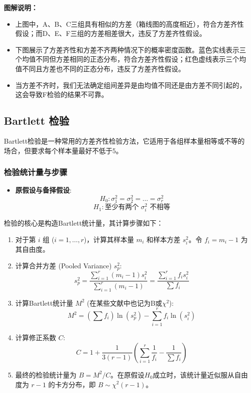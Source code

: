\documentclass[12pt, a4paper]{amsart}
\begin{document}
\textbf{图解说明：}
\begin{itemize}
    \item 上图中，A、B、C三组具有相似的方差（箱线图的高度相近），符合方差齐性假设；而D、E、F三组的方差相差很大，违反了方差齐性假设。
    \item 下图展示了方差齐性和方差不齐两种情况下的概率密度函数。蓝色实线表示三个均值不同但方差相同的正态分布，符合方差齐性假设；红色虚线表示三个均值不同且方差也不同的正态分布，违反了方差齐性假设。
    \item 当方差不齐时，我们无法确定组间差异是由均值不同还是由方差不同引起的，这会导致F检验的结果不可靠。
\end{itemize}

\subsection{Bartlett 检验}
Bartlett检验是一种常用的方差齐性检验方法，它适用于各组样本量相等或不等的场合，但要求每个样本量最好不低于5。

\subsubsection{检验统计量与步骤}
\begin{itemize}
    \item \textbf{原假设与备择假设}:
        $$ H_0: \sigma_1^2 = \sigma_2^2 = \dots = \sigma_r^2 $$
        $$ H_1: \text{至少有两个 } \sigma_i^2 \text{ 不相等} $$
\end{itemize}

检验的核心是构造Bartlett统计量，其计算步骤如下：
\begin{enumerate}
    \item 对于第 $i$ 组 ($i=1, \dots, r$)，计算其样本量 $m_i$ 和样本方差 $s_i^2$。令 $f_i = m_i - 1$ 为其自由度。
    \item 计算合并方差 (Pooled Variance) $s_p^2$:
    \begin{equation}
    s_p^2 = \frac{\sum_{i=1}^{r} (m_i-1)s_i^2}{\sum_{i=1}^{r} (m_i-1)} = \frac{\sum_{i=1}^{r} f_i s_i^2}{\sum f_i}
    \end{equation}
    \item 计算Bartlett统计量 $M^2$ (在某些文献中也记为B或$\chi^2$):
    \begin{equation}
    M^2 = (\sum f_i) \ln(s_p^2) - \sum_{i=1}^{r} f_i \ln(s_i^2)
    \end{equation}
    \item 计算修正系数 $C$:
    \begin{equation}
    C = 1 + \frac{1}{3(r-1)} \left( \sum_{i=1}^{r} \frac{1}{f_i} - \frac{1}{\sum f_i} \right)
    \end{equation}
    \item 最终的检验统计量为 $B = M^2/C$。在原假设$H_0$成立时，该统计量近似服从自由度为 $r-1$ 的卡方分布，即 $B \sim \chi^2(r-1)$。
\end{enumerate}
\end{document}
